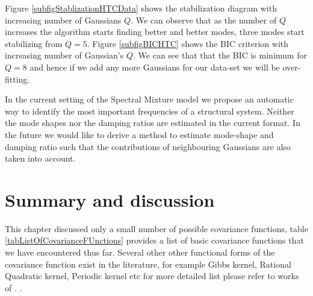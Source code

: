 Figure \ref{subfigStablizationHTCData} shows the stabilization diagram with increasing number of Gaussians $Q$. We can observe that as the number of $Q$ increases the algorithm starts finding better and better modes, three modes start stabilizing from $Q=5$. Figure \ref{subfigBICHTC} shows the BIC criterion with increasing number of Gaussian's $Q$. We can see that that the BIC is minimum for $Q=8$ and hence if we add any more Gaussians for our data-set we will be  over-fitting. 

In the current setting of the Spectral Mixture model we propose an automatic way to identify the most important frequencies of a structural system. Neither the mode shapes nor the damping ratios are estimated in the current format. In the future we would like to derive a method to estimate mode-shape and damping ratio such that the contributions of neighbouring Gaussians are also taken into account. 

\section{Summary and discussion}
This chapter discussed only a small number of possible covariance functions, table \ref{tabListOfCovarianceFUnctions} provides a list of basic covariance functions that we have encountered thus far. Several other other functional forms of the covariance function exist in the literature, for example Gibbs kernel, Rational Quadratic kernel, Periodic kernel etc for more detailed list please refer to works of \cite{Rasmussen2005, duvenaud2013structure, wilson2014thesis}. . 


